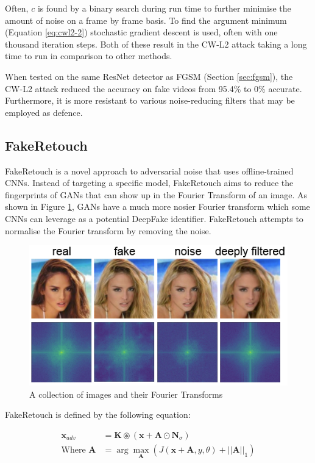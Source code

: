 Often, $c$ is found by a binary search during run time to further minimise the amount of noise on a frame by frame basis. To find the argument minimum (Equation \ref{eq:cwl2-2}) stochastic gradient descent is used, often with one thousand iteration steps. Both of these result in the CW-L2 attack taking a long time to run in comparison to other methods.

When tested on the same ResNet detector as FGSM (Section \ref{sec:fgsm}), the CW-L2 attack reduced the accuracy on fake videos from 95.4\% to 0\% accurate. Furthermore, it is more resistant to various noise-reducing filters that may be employed as defence\cite{gandhi2020adversarial}.

\subsection{FakeRetouch}

FakeRetouch\cite{huang2020fakeretouch} is a novel approach to adversarial noise that uses offline-trained CNNs. Instead of targeting a specific model, FakeRetouch aims to reduce the fingerprints of GANs that can show up in the Fourier Transform of an image. As shown in Figure \ref{fig:fakeretouch}, GANs have a much more nosier Fourier transform which some CNNs can leverage as a potential DeepFake identifier. FakeRetouch attempts to normalise the Fourier transform by removing the noise.

\begin{figure}[h]
    \centering
    \includegraphics[width=0.5\linewidth]{dissertation//figures/fakeretouch-noise.png}
    \caption{A collection of images and their Fourier Transforms}
    \label{fig:fakeretouch}
\end{figure}

FakeRetouch is defined by the following equation:

\begin{align}
    \mathbf{x}_{adv} &= \mathbf{K} \circledast (\mathbf{x} + \mathbf{A}\odot \mathbf{N}_{\sigma}) \label{eq:fakeretouch-1}\\
    \text{Where } \mathbf{A} &= \arg \max_{\mathbf{A}} \left(J(\mathbf{x}+\mathbf{A},y,\theta)+||\mathbf{A}||_1\right) \label{eq:fakeretouch-2}
\end{align}

